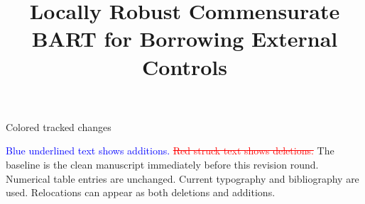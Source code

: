 \documentclass[11pt]{article}
\theoremstyle{definition}
\theoremstyle{plain}
\begin{document}
\sloppy
\begin{center}\Large Colored tracked changes\end{center}
\noindent\textcolor{blue}{Blue underlined text shows additions.}
\textcolor{red}{\sout{Red struck text shows deletions.}}
The baseline is the clean manuscript immediately before this revision round. Numerical table entries are unchanged.
Current typography and bibliography are used. Relocations can appear as both deletions and additions.
\clearpage

%

\providecommand{\SIMRESULT}[1]{\textbf{[SIM:\ #1]}}

\title{Locally Robust Commensurate BART for Borrowing External Controls}
\author{}
\date{}
\maketitle
\end{document}
